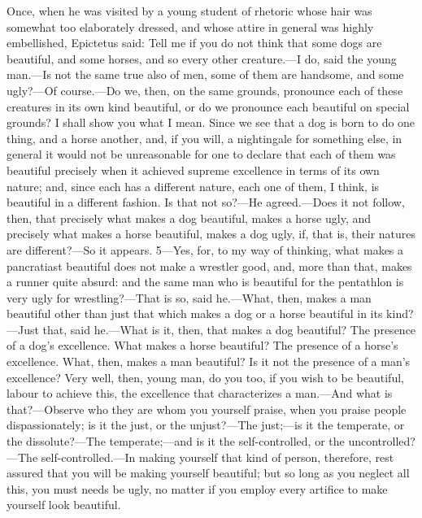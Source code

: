 Once, when he was visited by a young student of rhetoric whose hair was somewhat too elaborately dressed, and whose attire in general was highly embellished, Epictetus said: Tell me if you do not think that some dogs are beautiful, and some horses, and so every other creature.—I do, said the young man.—Is not the same true also of men, some of them are handsome, and some ugly?—Of course.—Do we, then, on the same grounds, pronounce each of these creatures in its own kind beautiful, or do we pronounce each beautiful on special grounds? I shall show you what I mean. Since we see that a dog is born to do one thing, and a horse another, and, if you will, a nightingale for something else, in general it would not be unreasonable for one to declare that each of them was beautiful precisely when it achieved supreme excellence in terms of its own nature; and, since each has a different nature, each one of them, I think, is beautiful in a different fashion. Is that not so?—He agreed.—Does it not follow, then, that precisely what makes a dog beautiful, makes a horse ugly, and precisely what makes a horse beautiful, makes a dog ugly, if, that is, their natures are different?—So it appears. 5—Yes, for, to my way of thinking, what makes a pancratiast beautiful does not make a wrestler good, and, more than that, makes a runner quite absurd: and the same man who is beautiful for the pentathlon is very ugly for wrestling?—That is so, said he.—What, then, makes a man beautiful other than just that which makes a dog or a horse beautiful in its kind?—Just that, said he.—What is it, then, that makes a dog beautiful? The presence of a dog's excellence. What makes a horse beautiful? The presence of a horse's excellence. What, then, makes a man beautiful? Is it not the presence of a man's excellence? Very well, then, young man, do you too, if you wish to be beautiful, labour to achieve this, the excellence that characterizes a man.—And what is that?—Observe who they are whom you yourself praise, when you praise people dispassionately; is it the just, or the unjust?—The just;—is it the temperate, or the dissolute?—The temperate;—and is it the self-controlled, or the uncontrolled?—The self-controlled.—In making yourself that kind of person, therefore, rest assured that you will be making yourself beautiful; but so long as you neglect all this, you must needs be ugly, no matter if you employ every artifice to make yourself look beautiful.

